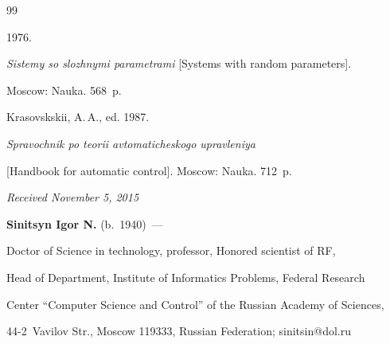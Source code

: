 {{\begin{thebibliography}{99}

 1976.

\textit{Sistemy so slozhnymi parametrami} [Systems with random parameters]. 

Moscow: Nauka. 568~p.




Krasovskskii, A.\,A., ed.  1987.

\textit{Spravochnik po teorii avtomaticheskogo upravleniya} 

[Handbook for automatic control]. Moscow:   Nauka. 712~p.



\end{thebibliography}

} }



\vspace*{-1pt}



\hfill{\small\textit{Received November 5, 2015}}



\Contrl



\noindent

\textbf{Sinitsyn Igor N.} (b.\ 1940)~---

Doctor of Science in technology, professor, Honored scientist of RF, 

Head of Department, Institute of Informatics Problems, Federal Research 

Center ``Computer Science and Control'' of the Russian Academy of Sciences, 

44-2~Vavilov Str., Moscow 119333, Russian Federation; sinitsin@dol.ru 



\label{end\stat}



\renewcommand{\bibname}{\protect\rm Литература}

